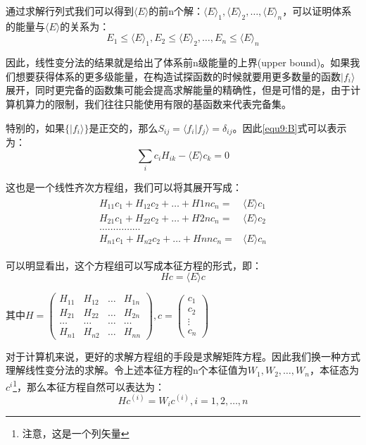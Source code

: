 通过求解行列式我们可以得到$\langle E\rangle$的前n个解：$\langle E\rangle_1,\langle E\rangle_2,\dots,\langle E\rangle_n$，可以证明体系的能量与$\langle E\rangle$的关系为：
\begin{equation}
    E_1\leq \langle E\rangle_1, E_2\leq \langle E\rangle_2,\dots, E_n\leq \langle E\rangle_n
\end{equation}

因此，线性变分法的结果就是给出了体系前n级能量的上界(upper bound)。如果我们想要获得体系的更多级能量，在构造试探函数的时候就要用更多数量的函数$|f_i\rangle$展开，同时更完备的函数集可能会提高求解能量的精确性，但是可惜的是，由于计算机算力的限制，我们往往只能使用有限的基函数来代表完备集。

特别的，如果$\{|f_i\rangle\}$是正交的，那么$S_{ij}=\langle f_i|f_j\rangle=\delta_{ij}$。因此\ref{equ9:B}式可以表示为：
\begin{equation}
     \sum_i c_iH_{ik}-\langle E\rangle c_k=0
\end{equation}

这也是一个线性齐次方程组，我们可以将其展开写成：
\begin{align}
    \begin{split}
        H_{11}c_1+H_{12}c_2+\dots+H{1n}c_n=&\langle E\rangle c_1\\
        H_{21}c_1+H_{22}c_2+\dots+H{2n}c_n=&\langle E\rangle c_2\\
        \dots\dots\dots\dots\dots\\
        H_{n1}c_1+H_{n2}c_2+\dots+H{nn}c_n=&\langle E\rangle c_n
    \end{split}
\end{align}

可以明显看出，这个方程组可以写成本征方程的形式，即：
\begin{equation}
    Hc=\langle E\rangle c
\end{equation}

其中$H=\begin{pmatrix} H_{11}&H_{12}&\dots&H_{1n}\\H_{21}&H_{22}&\dots&H_{2n}\\ \dots&\dots&\dots&\dots\\H_{n1}&H_{n2}&\dots&H_{nn}\end{pmatrix},c=\begin{pmatrix}c_1\\c_2\\ \vdots\\c_n\end{pmatrix}$

对于计算机来说，更好的求解方程组的手段是求解矩阵方程。因此我们换一种方式理解线性变分法的求解。令上述本征方程的n个本征值为$W_1,W_2,\dots,W_n$，本征态为$c^{i}$\footnote{注意，这是一个列矢量}，那么本征方程自然可以表达为：
\begin{equation}
    Hc^{(i)}=W_ic^{(i)},i=1,2,\dots,n
\end{equation}

